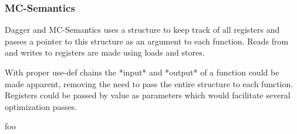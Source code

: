 
\subsubsection{MC-Semantics}

Dagger and MC-Semantics uses a structure to keep track of all registers and passes a pointer to this structure as an argument to each function. Reads from and writes to registers are made using loads and stores.

With proper use-def chains the *input* and *output* of a function could be made apparent, removing the need to pass the entire structure to each function. Registers could be passed by value as parameters which would facilitate several optimization passes.





foo \cite{mcsema}
